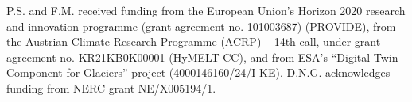 \documentclass[journal abbreviation, manuscript]{copernicus}
\begin{document}

\begin{acknowledgements}
P.S. and F.M. received funding from the European Union’s Horizon 2020 research and innovation programme (grant agreement no. 101003687) (PROVIDE), from the Austrian Climate Research Programme (ACRP) – 14th call, under grant agreement no. KR21KB0K00001 (HyMELT-CC), and from ESA's “Digital Twin Component for Glaciers” project (4000146160/24/I-KE). D.N.G. acknowledges funding from NERC grant NE/X005194/1.
\end{acknowledgements}


















\end{document}
